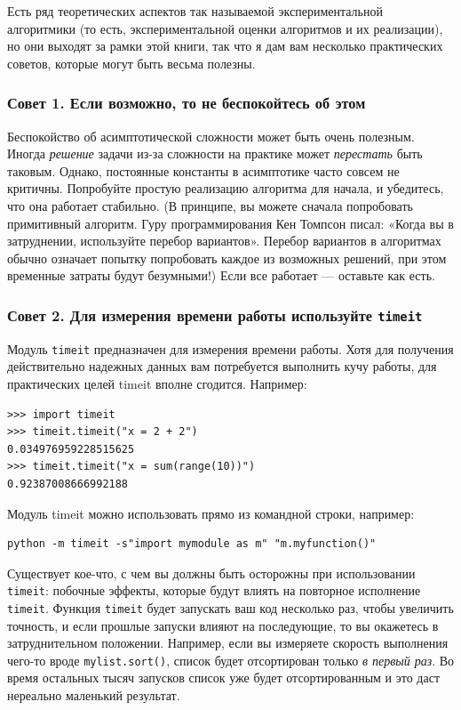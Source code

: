 Есть ряд теоретических аспектов так называемой экспериментальной алгоритмики (то есть, экспериментальной оценки алгоритмов и их реализации), но они выходят за рамки этой книги, так что я дам вам несколько практических советов, которые могут быть весьма полезны.

\subsubsection*{Совет 1. Если возможно, то не беспокойтесь об этом}

Беспокойство об асимптотической сложности может быть очень полезным. Иногда \textit{решение} задачи из-за сложности на практике может \textit{перестать} быть таковым. Однако, постоянные константы в асимптотике часто совсем не критичны. Попробуйте простую реализацию алгоритма для начала, и убедитесь, что она работает стабильно. (В принципе, вы можете сначала попробовать примитивный алгоритм. Гуру программирования Кен Томпсон писал: «Когда вы в затруднении, используйте перебор вариантов». Перебор вариантов в алгоритмах обычно означает попытку попробовать каждое из возможных решений, при этом временные затраты будут безумными!) Если все работает — оставьте как есть.

\subsubsection*{Совет 2. Для измерения времени работы используйте \texttt{timeit}}

Модуль \texttt{timeit} предназначен для измерения времени работы. Хотя для получения действительно надежных данных вам потребуется выполнить кучу работы, для практических целей timeit вполне сгодится. Например:

\begin{lstlisting}
>>> import timeit
>>> timeit.timeit("x = 2 + 2")
0.034976959228515625
>>> timeit.timeit("x = sum(range(10))")
0.92387008666992188
\end{lstlisting}

Модуль timeit можно использовать прямо из командной строки, например:

\begin{lstlisting}
python -m timeit -s"import mymodule as m" "m.myfunction()"
\end{lstlisting}

Существует кое-что, с чем вы должны быть осторожны при использовании \texttt{timeit}: побочные эффекты, которые будут влиять на повторное исполнение \texttt{timeit}. Функция \texttt{timeit} будет запускать ваш код несколько раз, чтобы увеличить точность, и если прошлые запуски влияют на последующие, то вы окажетесь в затруднительном положении. Например, если вы измеряете скорость выполнения чего-то вроде \texttt{mylist.sort()}, список будет отсортирован только \textit{в первый раз}. Во время остальных тысяч запусков список уже будет отсортированным и это даст нереально маленький результат.


